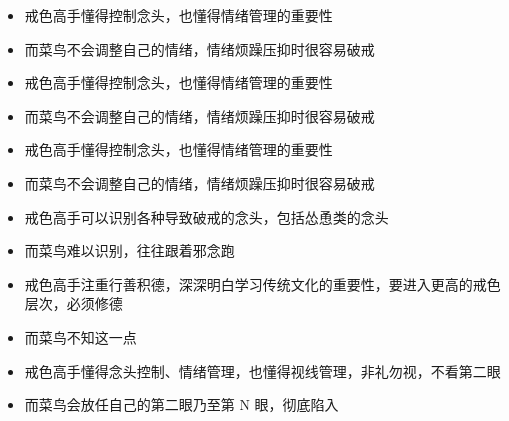 \documentclass{ctexart}
\begin{document}
\begin{paracol}{2}
    \begin{itemize}
        \item 戒色高手懂得控制念头，也懂得情绪管理的重要性
    \end{itemize}
    \switchcolumn
    \begin{itemize}
        \item 而菜鸟不会调整自己的情绪，情绪烦躁压抑时很容易破戒
    \end{itemize}
    \switchcolumn*

    \begin{itemize}
        \item 戒色高手懂得控制念头，也懂得情绪管理的重要性
    \end{itemize}
    \switchcolumn
    \begin{itemize}
        \item 而菜鸟不会调整自己的情绪，情绪烦躁压抑时很容易破戒
    \end{itemize}
    \switchcolumn*

    \begin{itemize}
        \item 戒色高手懂得控制念头，也懂得情绪管理的重要性
    \end{itemize}
    \switchcolumn
    \begin{itemize}
        \item 而菜鸟不会调整自己的情绪，情绪烦躁压抑时很容易破戒
    \end{itemize}
    \switchcolumn*

    \begin{itemize}
        \item 戒色高手可以识别各种导致破戒的念头，包括怂恿类的念头
    \end{itemize}
    \switchcolumn
    \begin{itemize}
        \item 而菜鸟难以识别，往往跟着邪念跑
    \end{itemize}
    \switchcolumn*

    \begin{itemize}
        \item 戒色高手注重行善积德，深深明白学习传统文化的重要性，要进入更高的戒色层次，必须修德
    \end{itemize}
    \switchcolumn
    \begin{itemize}
        \item 而菜鸟不知这一点
    \end{itemize}
    \switchcolumn*

    \begin{itemize}
        \item 戒色高手懂得念头控制、情绪管理，也懂得视线管理，非礼勿视，不看第二眼
    \end{itemize}
    \switchcolumn
    \begin{itemize}
        \item 而菜鸟会放任自己的第二眼乃至第 N 眼，彻底陷入
    \end{itemize}
    \switchcolumn*


\end{paracol}
\end{document}
